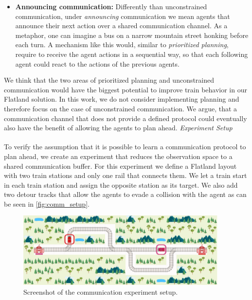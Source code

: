 \begin{itemize}
	\item \textbf{Announcing communication:} Differently than unconstrained communication, under \textit{announcing} communication we mean agents that announce their next action over a shared communication channel. As a metaphor, one can imagine a bus on a narrow mountain street honking before each turn. A mechanism like this would, similar to \textit{prioritized planning}, require to receive the agent actions in a sequential way, so that each following agent could react to the actions of the previous agents.
\end{itemize}

We think that the two areas of prioritized planning and unconstrained communication would have the biggest potential to improve train behavior in our Flatland solution. In this work, we do not consider implementing planning and therefore focus on the case of unconstrained communication. We argue, that a communication channel that does not provide a defined protocol could eventually also have the benefit of allowing the agents to plan ahead.
\newpage
\textit{Experiment Setup}\\\\
To verify the assumption that it is possible to learn a communication protocol to plan ahead, we create an experiment that reduces the observation space to a shared communication buffer. For this experiment we define a Flatland layout with two train stations and only one rail that connects them. We let a train start in each train station and assign the opposite station as its target. We also add two detour tracks that allow the agents to evade a collision with the agent as can be seen in \autoref{fig:comm_setup}.

\begin{figure}[H]
	\centering
	\includegraphics[width=300pt]{images/communication_experiment.png}
	\caption{Screenshot of the communication experiment setup.}
	\label{fig:comm_setup}
\end{figure}


